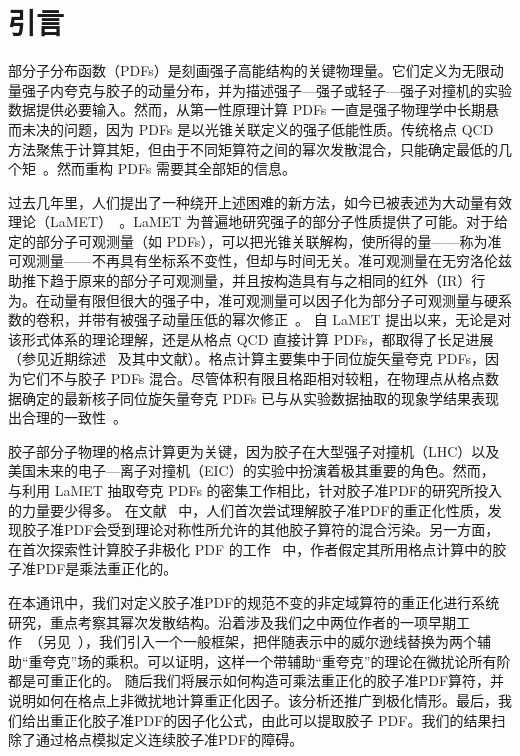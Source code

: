 \section{引言}\label{sec:intro}

部分子分布函数（PDFs）是刻画强子高能结构的关键物理量。它们定义为无限动量强子内夸克与胶子的动量分布，并为描述强子—强子或轻子—强子对撞机的实验数据提供必要输入。然而，从第一性原理计算 PDFs 一直是强子物理学中长期悬而未决的问题，因为 PDFs 是以光锥关联定义的强子低能性质。传统格点 QCD 方法聚焦于计算其矩，但由于不同矩算符之间的幂次发散混合，只能确定最低的几个矩~\cite{Martinelli:1987zd,Martinelli:1988xs,Detmold:2001dv,Dolgov:2002zm}。然而重构 PDFs 需要其全部矩的信息。

过去几年里，人们提出了一种绕开上述困难的新方法，如今已被表述为大动量有效理论（LaMET）~\cite{Ji:2013dva,Ji:2014gla}。LaMET 为普遍地研究强子的部分子性质提供了可能。对于给定的部分子可观测量（如 PDFs），可以把光锥关联解构，使所得的量——称为准可观测量——不再具有坐标系不变性，但却与时间无关。准可观测量在无穷洛伦兹助推下趋于原来的部分子可观测量，并且按构造具有与之相同的红外（IR）行为。在动量有限但很大的强子中，准可观测量可以因子化为部分子可观测量与硬系数的卷积，并带有被强子动量压低的幂次修正~\cite{Ji:2013dva,Ji:2014gla,Xiong:2013bka,Ma:2017pxb,Izubuchi:2018srq,Ji:2015qla,Xiong:2015nua}。
自 LaMET 提出以来，无论是对该形式体系的理论理解，还是从格点 QCD 直接计算 PDFs，都取得了长足进展（参见近期综述~\cite{Cichy:2018mum} 及其中文献）。格点计算主要集中于同位旋矢量夸克 PDFs，因为它们不与胶子 PDFs 混合。尽管体积有限且格距相对较粗，在物理点从格点数据确定的最新核子同位旋矢量夸克 PDFs 已与从实验数据抽取的现象学结果表现出合理的一致性~\cite{Chen:2018xof,Lin:2018qky,Alexandrou:2018pbm,Alexandrou:2018eet,Liu:2018hxv,Dulat:2015mca,Ball:2017nwa,Harland-Lang:2014zoa,Nocera:2014gqa,Ethier:2017zbq}。

胶子部分子物理的格点计算更为关键，因为胶子在大型强子对撞机（LHC）以及美国未来的电子—离子对撞机（EIC）的实验中扮演着极其重要的角色。然而，
与利用 LaMET 抽取夸克 PDFs 的密集工作相比，针对胶子准PDF的研究所投入的力量要少得多。
在文献~\cite{Wang:2017qyg,Wang:2017eel} 中，人们首次尝试理解胶子准PDF的重正化性质，发现胶子准PDF会受到理论对称性所允许的其他胶子算符的混合污染。另一方面，在首次探索性计算胶子非极化 PDF 的工作~\cite{Fan:2018dxu} 中，作者假定其所用格点计算中的胶子准PDF是乘法重正化的。

在本通讯中，我们对定义胶子准PDF的规范不变的非定域算符的重正化进行系统研究，重点考察其幂次发散结构。沿着涉及我们之中两位作者的一项早期工作~\cite{Ji:2017oey}（另见~\cite{Ishikawa:2017faj,Green:2017xeu}），我们引入一个一般框架，把伴随表示中的威尔逊线替换为两个辅助“重夸克”场的乘积。可以证明，这样一个带辅助“重夸克”的理论在微扰论所有阶都是可重正化的。
随后我们将展示如何构造可乘法重正化的胶子准PDF算符，并说明如何在格点上非微扰地计算重正化因子。该分析还推广到极化情形。最后，我们给出重正化胶子准PDF的因子化公式，由此可以提取胶子 PDF。我们的结果扫除了通过格点模拟定义连续胶子准PDF的障碍。
